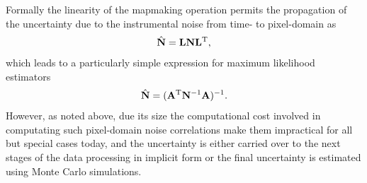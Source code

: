 Formally the linearity of the mapmaking operation permits the propagation of the uncertainty due to the instrumental noise from time- to pixel-domain as
\begin{eqnarray}
{\hat{\mathbf{N}}} = \mathbf{L} \mathbf{N} \mathbf{L}^{\rm T},
\end{eqnarray}
which leads to a particularly simple expression for maximum likelihood estimators 
\begin{eqnarray}
{\hat{\mathbf{N}}} = (\mathbf{A}^{\rm T} \mathbf{N}^{-1} \mathbf{A})^{-1}.
\end{eqnarray}
However, as noted above, due its size the computational cost involved in computating such pixel-domain noise correlations make them impractical for all but special cases today, and the uncertainty is either carried over to the next stages of the data processing in implicit form or the final uncertainty is estimated using Monte Carlo simulations.

%



